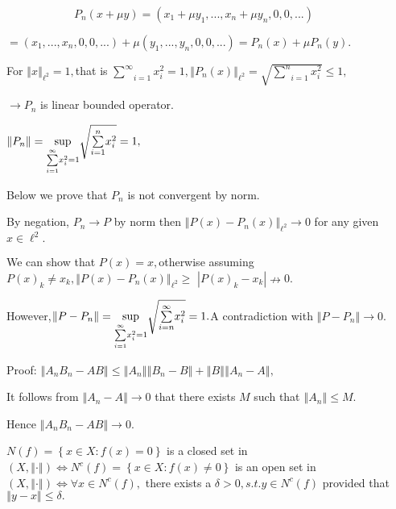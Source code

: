 \documentclass{article}
\begin{document}
$\qquad \qquad \qquad P_{n}\left( x+\mu y\right) =\left( x_{1}+\mu
y_{1},...,x_{n}+\mu y_{n},0,0,...\right) $

$=\left( x_{1},...,x_{n},0,0,...\right) +\mu \left(
y_{1},...,y_{n},0,0,...\right) =P_{n}\left( x\right) +\mu P_{n}\left(
y\right) .$

For $\left\Vert x\right\Vert _{\ell ^{2}}=1,$that is $\underset{i=1}{\overset%
{\infty }{\sum }}x_{i}^{2}=1,\left\Vert P_{n}\left( x\right) \right\Vert
_{\ell ^{2}}=\sqrt{\underset{i=1}{\overset{n}{\sum }}x_{i}^{2}}\leq 1,$

$\rightarrow P_{n}$ is linear bounded operator.

$\left\Vert P_{n}\right\Vert =\underset{\underset{i=1}{\overset{\infty }{%
\sum }}x_{i}^{2}=1}{\sup }\sqrt{\underset{i=1}{\overset{n}{\sum }}x_{i}^{2}}%
=1,$

Below we prove that $P_{n}$ is not convergent by norm.

By negation, $P_{n}\rightarrow P$ by norm then $\left\Vert P\left( x\right)
-P_{n}\left( x\right) \right\Vert _{\ell ^{2}}\rightarrow 0$ for any given $%
x\in \ell ^{2}.$

We can show that $P\left( x\right) =x,$otherwise assuming $P\left( x\right)
_{k}\neq x_{k},\left\Vert P\left( x\right) -P_{n}\left( x\right) \right\Vert
_{\ell ^{2}}\geq $ $\left\vert P\left( x\right) _{k}-x_{k}\right\vert
\nrightarrow 0.$

However,$\left\Vert P-P_{n}\right\Vert =\underset{\underset{i=1}{\overset{%
\infty }{\sum }}x_{i}^{2}=1}{\sup }\sqrt{\underset{i=n}{\overset{\infty }{%
\sum }}x_{i}^{2}}=1.$A contradiction with $\left\Vert P-P_{n}\right\Vert
\rightarrow 0.$


Proof: $\left\Vert A_{n}B_{n}-AB\right\Vert \leq \left\Vert A_{n}\right\Vert
\left\Vert B_{n}-B\right\Vert +\left\Vert B\right\Vert \left\Vert
A_{n}-A\right\Vert ,$

It follows from $\left\Vert A_{n}-A\right\Vert \rightarrow 0$ that there
exists $M$ such that $\left\Vert A_{n}\right\Vert \leq M.$

Hence $\left\Vert A_{n}B_{n}-AB\right\Vert \rightarrow 0.$


$N\left( f\right) =\left\{ x\in X:f\left( x\right) =0\right\} $ is a closed
set in $\left( X,\left\Vert \cdot \right\Vert \right) \iff N^{c}\left(
f\right) =\left\{ x\in X:f\left( x\right) \neq 0\right\} $ is an open set in 
$\left( X,\left\Vert \cdot \right\Vert \right) \iff \forall x\in N^{c}\left(
f\right) ,$ there exists a $\delta >0,s.t.y\in N^{c}\left( f\right) $
provided that $\left\Vert y-x\right\Vert \leq \delta .$
\end{document}
